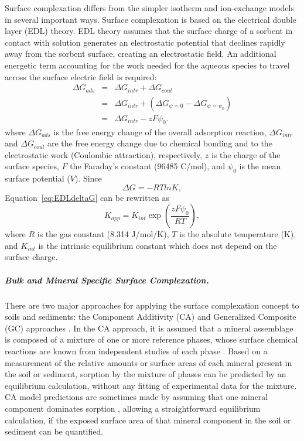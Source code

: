 Surface complexation differs from the simpler isotherm and
ion-exchange models in several important ways. Surface complexation is
based on the electrical double layer (EDL) theory. EDL theory assumes
that the surface charge of a sorbent in contact with solution
generates an electrostatic potential that declines rapidly away from
the sorbent surface, creating an electrostatic field. An additional
energetic term accounting for the work needed for the aqueous species
to travel across the surface electric field is required:
%
\begin{eqnarray} \label{eq:EDLdeltaG}
\Delta G_{ads} & = & \Delta G_{intr} + \Delta G_{coul} \nonumber \\
               & = & \Delta G_{intr} + (\Delta G_{\psi =0} - \Delta G_{\psi =\psi_{0} } ) \nonumber \\
               & = & \Delta G_{intr} - z F \psi_{0}  .
\end{eqnarray} 
\noindent where $\Delta G_{ads} $ is the free energy change of the overall adsorption reaction, $\Delta G_{intr} $ and $\Delta G_{coul} $ are the free energy change due to chemical bonding and to the electrostatic work (Coulombic attraction), respectively, $z$ is the charge of the surface species, $F$ the Faraday's constant (96485 C/mol), and $\psi _{0} $ is the mean surface potential ($V$). Since
%
\begin{equation} \label{eq:deltaGKeq}
  \Delta G = -RTlnK,
\end{equation}
%
\noindent Equation~\eqref{eq:EDLdeltaG} can be rewritten as
\begin{equation} \label{eq:KappEDL} 
K_{app}  = K_{int} \exp\left({\frac{z F \psi _{0} }{RT} } \right),
\end{equation} 
where $R$ is the gas constant (8.314 J/mol/K), $T$ is the absolute
temperature (K), and $K_{int}$ is the intrinsic equilibrium constant
which does not depend on the surface charge.


\subparagraph{Bulk and Mineral Specific Surface Complexation. }

There are two major approaches for applying the surface complexation
concept to soils and sediments: the Component Additivity (CA) and
Generalized Composite (GC) approaches \citep{davis-2004, davis-1998}. In
the CA approach, it is assumed that a mineral assemblage is composed
of a mixture of one or more reference phases, whose surface chemical
reactions are known from independent studies of each phase \citep[e.g.][]{
landry-2009, davis-2004, arnold-2001}. Based
on a measurement of the relative amounts or surface areas of each
mineral present in the soil or sediment, sorption by the mixture of
phases can be predicted by an equilibrium calculation, without any
fitting of experimental data for the mixture. CA model predictions are
sometimes made by assuming that one mineral component dominates
sorption \citep{zhang-2009, davis-2004, payne-2004, barnett-2002},
allowing a straightforward equilibrium calculation, if the exposed
surface area of that mineral component in the soil or sediment can be
quantified.

